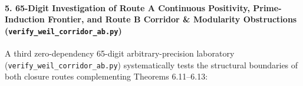 \documentclass[
  11pt,
]{article}
\begin{document}
\paragraph{\texorpdfstring{5. 65-Digit Investigation of Route A
Continuous Positivity, Prime-Induction Frontier, and Route B Corridor \&
Modularity Obstructions
(\texttt{verify\_weil\_corridor\_ab.py})}{5. 65-Digit Investigation of Route A Continuous Positivity, Prime-Induction Frontier, and Route B Corridor \& Modularity Obstructions (verify\_weil\_corridor\_ab.py)}}\label{digit-investigation-of-route-a-continuous-positivity-prime-induction-frontier-and-route-b-corridor-modularity-obstructions-verify_weil_corridor_ab.py}

A third zero-dependency 65-digit arbitrary-precision laboratory
(\texttt{verify\_weil\_corridor\_ab.py}) systematically tests the
structural boundaries of both closure routes complementing Theorems
6.11--6.13:
\end{document}
